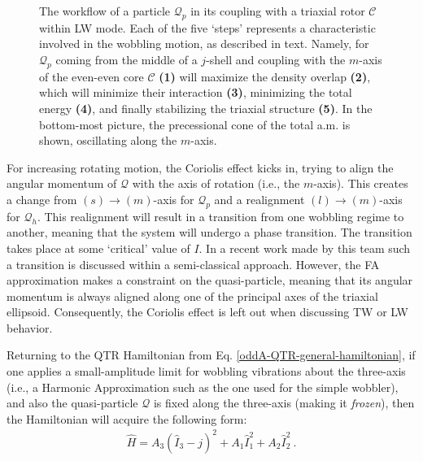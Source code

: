 \begin{figure}
    \centering
    
    \caption{The workflow of a particle $\mathcal{Q}_p$ in its coupling with a triaxial rotor $\mathscr{C}$ within LW mode. Each of the five `steps' represents a characteristic involved in the wobbling motion, as described in text. Namely, for $\mathcal{Q}_p$ coming from the middle of a $j$-shell and coupling with the $m$-axis of the even-even core $\mathscr{C}$ \textbf{(1)} will maximize the density overlap \textbf{(2)}, which will minimize their interaction \textbf{(3)}, minimizing the total energy \textbf{(4)}, and finally stabilizing the triaxial structure \textbf{(5)}. In the bottom-most picture, the precessional cone of the total a.m. is shown, oscillating along the $m$-axis.}
    \label{advanced-quasiparticle-coupling-3}
\end{figure}

For increasing rotating motion, the Coriolis effect kicks in, trying to align the angular momentum of $\mathcal{Q}$ with the axis of rotation (i.e., the $m$-axis). This creates a change from $(s)\to (m)$-axis for $\mathcal{Q}_p$ and a realignment $(l) \to (m)$-axis for $\mathcal{Q}_h$. This realignment will result in a transition from one wobbling regime to another, meaning that the system will undergo a phase transition. The transition takes place at some `critical' value of $I$. In a recent work made by this team \cite{poenaru2021extensive1,poenaru2021extensive2} such a transition is discussed within a semi-classical approach. However, the FA approximation makes a constraint on the quasi-particle, meaning that its angular momentum is always aligned along one of the principal axes of the triaxial ellipsoid. Consequently, the Coriolis effect is left out when discussing TW or LW behavior.

Returning to the QTR Hamiltonian from Eq. \ref{oddA-QTR-general-hamiltonian}, if one applies a small-amplitude limit for wobbling vibrations about the three-axis (i.e., a Harmonic Approximation such as the one used for the simple wobbler), and also the quasi-particle $\mathcal{Q}$ is fixed along the three-axis (making it \emph{frozen}), then the Hamiltonian will acquire the following form:
\begin{align}
    \hat{H}=A_3(\hat{I}_3-j)^2+A_1\hat{I}_1^2+A_2\hat{I}_2^2\ .
    \label{hamiltonian-qtr-FA}
\end{align}

